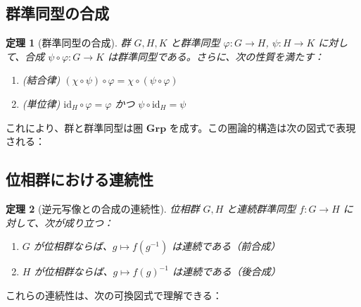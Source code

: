 \documentclass[uplatex, a4paper]{jlreq}
\newtheorem{theorem}{定理}[section]
\newcommand{\Grp}{\mathbf{Grp}}
\newcommand{\id}{\mathrm{id}}
\newcommand{\comp}{\circ}
\newcommand{\inv}{^{-1}}
\begin{document}
\subsection{群準同型の合成}

\begin{theorem}[群準同型の合成]
\label{thm:group-hom-composition}
群 $G, H, K$ と群準同型 $\varphi: G \to H$, $\psi: H \to K$ に対して、合成 $\psi \comp \varphi: G \to K$ は群準同型である。さらに、次の性質を満たす：
\begin{enumerate}
\item (結合律) $(\chi \comp \psi) \comp \varphi = \chi \comp (\psi \comp \varphi)$
\item (単位律) $\id_H \comp \varphi = \varphi$ かつ $\psi \comp \id_H = \psi$
\end{enumerate}
\end{theorem}

これにより、群と群準同型は圏 $\Grp$ を成す。この圏論的構造は次の図式で表現される：

\begin{center}
\end{center}

\subsection{位相群における連続性}

\begin{theorem}[逆元写像との合成の連続性]
\label{thm:topological-group-continuity}
位相群 $G, H$ と連続群準同型 $f: G \to H$ に対して、次が成り立つ：
\begin{enumerate}
\item $G$ が位相群ならば、$g \mapsto f(g\inv)$ は連続である（前合成）
\item $H$ が位相群ならば、$g \mapsto f(g)\inv$ は連続である（後合成）
\end{enumerate}
\end{theorem}

これらの連続性は、次の可換図式で理解できる：

\begin{center}
\end{center}
\end{document}
